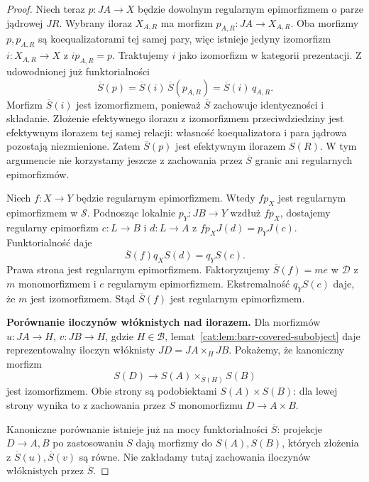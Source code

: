 \begin{proof}
Niech teraz $p:JA\to X$ będzie dowolnym regularnym epimorfizmem o parze jądrowej $JR$. Wybrany iloraz $X_{A,R}$ ma morfizm $p_{A,R}:JA\to X_{A,R}$. Oba morfizmy $p,p_{A,R}$ są koequalizatorami tej samej pary, więc istnieje jedyny izomorfizm $i:X_{A,R}\to X$ z $i p_{A,R}=p$. Traktujemy $i$ jako izomorfizm w kategorii prezentacji. Z udowodnionej już funktorialności
\[
 \overline S(p)=\overline S(i)\,\overline S(p_{A,R})
               =\overline S(i)\,q_{A,R}.
\]
Morfizm $\overline S(i)$ jest izomorfizmem, ponieważ $\overline S$ zachowuje identyczności i składanie. Złożenie efektywnego ilorazu z izomorfizmem przeciwdziedziny jest efektywnym ilorazem tej samej relacji: własność koequalizatora i para jądrowa pozostają niezmienione. Zatem $\overline S(p)$ jest efektywnym ilorazem $S(R)$. W tym argumencie nie korzystamy jeszcze z zachowania przez $\overline S$ granic ani regularnych epimorfizmów.

Niech $f:X\to Y$ będzie regularnym epimorfizmem. Wtedy $fp_X$ jest regularnym epimorfizmem w $\mathcal S$. Podnosząc lokalnie $p_Y:JB\to Y$ wzdłuż $fp_X$, dostajemy regularny epimorfizm $c:L\to B$ i $d:L\to A$ z $fp_XJ(d)=p_YJ(c)$. Funktorialność daje
\[
 \overline S(f)q_X S(d)=q_Y S(c).
\]
Prawa strona jest regularnym epimorfizmem. Faktoryzujemy $\overline S(f)=me$ w $\mathcal D$ z $m$ monomorfizmem i $e$ regularnym epimorfizmem. Ekstremalność $q_Y S(c)$ daje, że $m$ jest izomorfizmem. Stąd $\overline S(f)$ jest regularnym epimorfizmem.

\textbf{Porównanie iloczynów włóknistych nad ilorazem.}
Dla morfizmów $u:JA\to H$, $v:JB\to H$, gdzie $H\in\mathcal B$, lemat~\ref{cat:lem:barr-covered-subobject} daje reprezentowalny iloczyn włóknisty $JD=JA\times_H JB$. Pokażemy, że kanoniczny morfizm
\begin{equation}\label{cat:eq:barr-compare-representable-pullback}
 S(D)\longrightarrow S(A)\times_{\overline S(H)}S(B)
\end{equation}
jest izomorfizmem. Obie strony są podobiektami $S(A)\times S(B)$: dla lewej strony wynika to z zachowania przez $S$ monomorfizmu $D\to A\times B$.

Kanoniczne porównanie istnieje już na mocy funktorialności $\overline S$: projekcje $D\to A,B$ po zastosowaniu $S$ dają morfizmy do $S(A),S(B)$, których złożenia z $\overline S(u),\overline S(v)$ są równe. Nie zakładamy tutaj zachowania iloczynów włóknistych przez $\overline S$.


\end{proof}
